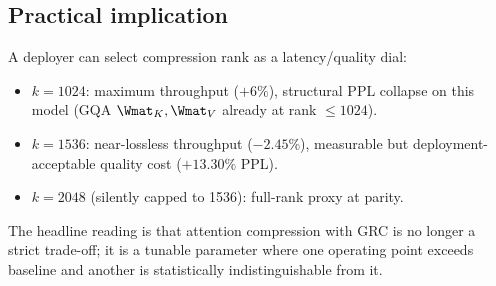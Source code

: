 \documentclass[11pt]{article}
\begin{document}
\subsection{Practical implication}

A deployer can select compression rank as a latency/quality dial:
\begin{itemize}
\item $k{=}1024$: maximum throughput ($+6\%$), structural PPL collapse on
this model (GQA $\Wmat_K,\Wmat_V$ already at rank $\leq 1024$).
\item $k{=}1536$: near-lossless throughput ($-2.45\%$), measurable but
deployment-acceptable quality cost ($+13.30\%$ PPL).
\item $k{=}2048$ (silently capped to 1536): full-rank proxy at parity.
\end{itemize}
The headline reading is that attention compression with GRC is no longer a
strict trade-off; it is a tunable parameter where one operating point
exceeds baseline and another is statistically indistinguishable from it.

\printbibliography
\end{document}
